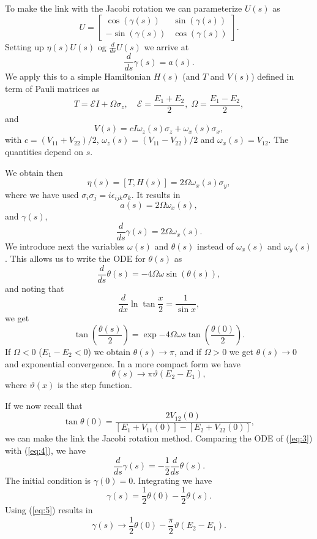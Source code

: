 To make the link with the Jacobi rotation
we can parameterize $U(s)$ as
\[ 
U = \begin{bmatrix} \cos(\gamma(s)) & \sin(\gamma(s)) \\ -\sin(\gamma(s)) & \cos(\gamma(s)) \end{bmatrix}. 
\]
Setting up $\eta(s)U(s)$ og $\frac{d}{ds} U(s)$ we arrive at 
\[ 
\frac{d}{ds} \gamma(s) = a(s). 
\]
We apply this to a simple Hamiltonian $H(s)$ (and $T$ and $V(s)$)  defined in term of Pauli matrices  as
\[ 
T = \mathcal{E} I + \Omega \sigma_z, \quad \mathcal{E} = \frac{E_1+ E_2}{2}, \; \Omega = \frac{E_1-E_2}{2}, 
\]
and
\[ 
V(s) = c I \omega_z(s)\sigma_z + \omega_x(s)\sigma_x, 
\]
with $c = (V_{11}+V_{22})/2$, $\omega_z(s) = (V_{11}-V_{22})/2$ and $\omega_x(s) = V_12$. The quantities depend on
$s$. 

We obtain then
\[ \eta(s) = [T, H(s)] = 2\Omega\omega_x(s)\sigma_y, \]
where we have used $\sigma_i\sigma_j = i\epsilon_{ijk}\sigma_k$.
It results in
\[ a(s) = 2\Omega \omega_x(s), \]
and $\gamma(s)$,
\begin{equation} \frac{d}{ds} \gamma(s) = 2\Omega\omega_x(s). \label{eq:3}\end{equation}
We introduce next the  variables $\omega(s)$ and $\theta(s)$ instead of
$\omega_x(s)$ and $\omega_y(s)$. This allows us to write the ODE 
for $\theta(s)$ as
\begin{equation} 
\frac{d}{ds} \theta(s) = -4\Omega\omega \sin(\theta(s)), \label{eq:4}
\end{equation}
and noting that
\[ 
\frac{d}{dx} \ln \tan \frac{x}{2} = \frac{1}{\sin x}, 
\]
we get
\[ 
\tan\left(\frac{\theta(s)}{2}\right) = \exp{-4\Omega\omega s} \tan\left(
  \frac{\theta(0)}{2}\right). 
\]
If $\Omega<0$ ($E_1-E_2<0$) we obtain  $\theta(s)\rightarrow \pi$, and if 
$\Omega>0$ we get  $\theta(s)\rightarrow 0$ and exponential convergence. In a more 
compact form we have
\begin{equation} \theta(s) \rightarrow \pi \vartheta(E_2 - E_1),
  \label{eq:5} \end{equation}
where $\vartheta(x)$ is the  step function.

If we now recall that 
\[ \tan \theta(0) = \frac{2 V_{12}(0) }{[E_1 + V_{11}(0)]- [E_2 +
  V_{22}(0)]},
\]
we can make the link the Jacobi rotation method. Comparing the  ODE of (\ref{eq:3}) with 
(\ref{eq:4}), we have
\[ \frac{d}{ds} \gamma(s) = -\frac{1}{2} \frac{d}{ds} \theta(s). \]
The initial condition is 
$\gamma(0) = 0$. Integrating we have
\[ \gamma(s) = \frac{1}{2}\theta(0) - \frac{1}{2}\theta(s). \]
Using (\ref{eq:5}) results in 
\[ \gamma(s) \rightarrow \frac{1}{2}\theta(0) -
\frac{\pi}{2}\vartheta(E_2-E_1). \]

